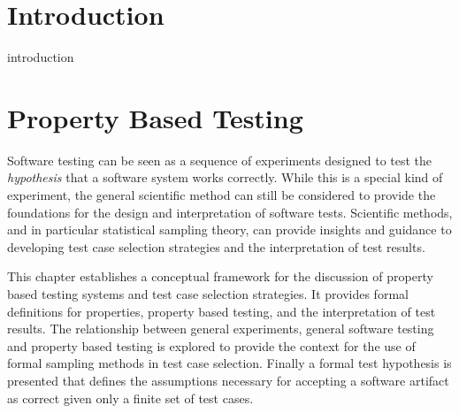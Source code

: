 \documentclass[11pt]{report}
\begin{document}
%
%  
%  
%  
%  
%
\afterpreface                      %

\setcounter{figure}{0}
\setcounter{equation}{0}
\setcounter{table}{0}
\chapter{Introduction}
 {introduction}                  %


\setcounter{figure}{0}
\setcounter{equation}{0}
\setcounter{table}{0}
\chapter{Property Based Testing}\label{chp:propertytesting}

Software testing can be seen as a sequence of experiments
designed to test the \emph{hypothesis} that
a software system works correctly.
While this is a special kind of experiment,
the general scientific method can still be considered
to provide the foundations for the design and interpretation of software tests.
Scientific methods, and in particular statistical sampling theory,
can provide insights and guidance to developing
test case selection strategies and 
the interpretation of test results.

This chapter establishes a conceptual framework
for the discussion of property based testing systems
and test case selection strategies.
It provides formal definitions for properties, property based testing,
and the interpretation of test results.
The relationship between general experiments,
general software testing and  property based testing
is explored to provide the context for
the use of formal sampling methods in test case selection.
Finally a formal test hypothesis is presented that defines
the assumptions necessary for accepting a software artifact as correct
given only a finite set of test cases.
\end{document}
